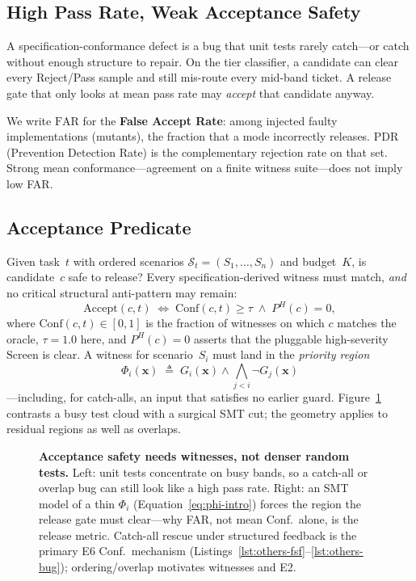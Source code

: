 \subsection{High Pass Rate, Weak Acceptance Safety}
A specification-conformance defect is a bug that unit tests rarely catch---or
catch without enough structure to repair.
On the tier classifier, a candidate can clear every Reject/Pass sample and
still mis-route every mid-band ticket.
A release gate that only looks at mean pass rate may \emph{accept} that
candidate anyway.

We write $\mathrm{FAR}$ for the \textbf{False Accept Rate}: among injected
faulty implementations (mutants), the fraction that a mode incorrectly
releases.
$\mathrm{PDR}$ (Prevention Detection Rate) is the complementary rejection
rate on that set.
Strong mean conformance---agreement on a finite witness suite---does not
imply low FAR.

\subsection{Acceptance Predicate}
Given task~$t$ with ordered scenarios $\mathcal{S}_t = (S_1,\ldots,S_n)$ and
budget~$K$, is candidate~$c$ safe to release?
Every specification-derived witness must match, \emph{and} no critical
structural anti-pattern may remain:
\begin{equation}
  \mathrm{Accept}(c, t)
  \;\iff\;
  \mathrm{Conf}(c, t) \geq \tau
  \;\wedge\;
  P^H(c) = 0,
  \label{eq:acceptance}
\end{equation}
where $\mathrm{Conf}(c,t)\in[0,1]$ is the fraction of witnesses on which $c$
matches the oracle, $\tau=1.0$ here, and $P^H(c)=0$ asserts that the
pluggable high-severity $\mathrm{Screen}$ is clear.
A witness for scenario~$S_i$ must land in the \emph{priority region}
\begin{equation}
  \Phi_i(\mathbf{x})
  \;\triangleq\;
  G_i(\mathbf{x}) \wedge \bigwedge_{j<i}\neg G_j(\mathbf{x})
  \label{eq:phi-intro}
\end{equation}
---including, for catch-alls, an input that satisfies no earlier guard.
Figure~\ref{fig:defect-vs-test} contrasts a busy test cloud with a surgical
SMT cut; the geometry applies to residual regions as well as overlaps.

\begin{figure}[t]
  \centering
  \caption{\textbf{Acceptance safety needs witnesses, not denser random tests.}
    Left: unit tests concentrate on busy bands, so a catch-all or overlap bug
    can still look like a high pass rate.
    Right: an SMT model of a thin $\Phi_i$ (Equation~\eqref{eq:phi-intro})
    forces the region the release gate must clear---why FAR, not mean Conf.\
    alone, is the release metric.
    Catch-all rescue under structured feedback is the primary E6 Conf.\
    mechanism (Listings~\ref{lst:others-fsf}--\ref{lst:others-bug});
    ordering/overlap motivates witnesses and E2.}
  \label{fig:defect-vs-test}
\end{figure}

